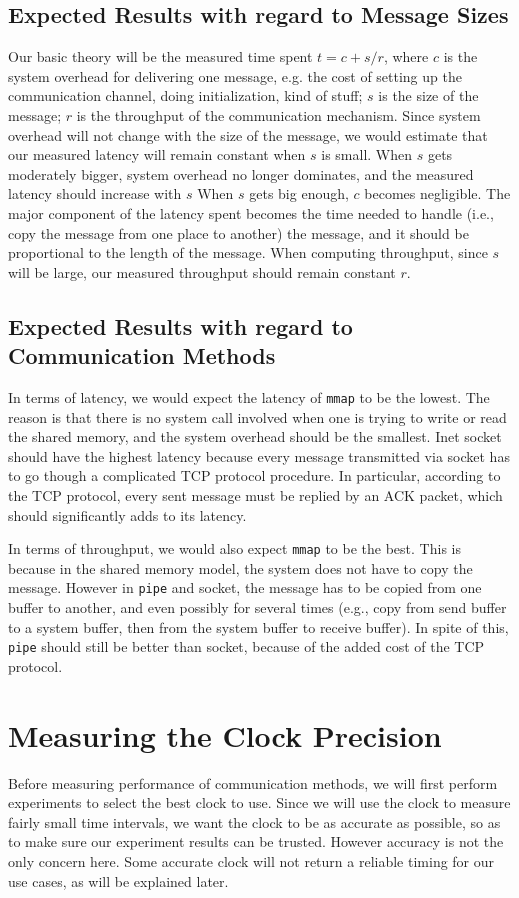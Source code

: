 \documentclass[11pt,conference]{IEEEtran}
\begin{document}
\subsection{Expected Results with regard to Message Sizes}
Our basic theory will be the measured time spent $t=c+s/r$, where $c$ is the system overhead for delivering one message, e.g. the cost of setting up the communication channel, doing initialization, kind of stuff; $s$ is the size of the message; $r$ is the throughput of the communication mechanism.
Since system overhead will not change with the size of the message, we would estimate that our measured latency will remain constant when $s$ is small.
When $s$ gets moderately bigger, system overhead no longer dominates, and the measured latency should increase with $s$
When $s$ gets big enough, $c$ becomes negligible.
The major component of the latency spent becomes the time needed to handle (i.e., copy the message from one place to another) the message, and it should be proportional to the length of the message.
When computing throughput, since $s$ will be large, our measured throughput should remain constant $r$.

\subsection{Expected Results with regard to Communication Methods}
In terms of latency, we would expect the latency of \texttt{mmap} to be the lowest.
The reason is that there is no system call involved when one is trying to write or read the shared memory, and the system overhead should be the smallest.
Inet socket should have the highest latency because every message transmitted via socket has to go though a complicated TCP protocol procedure.
In particular, according to the TCP protocol, every sent message must be replied by an ACK packet, which should significantly adds to its latency.

In terms of throughput, we would also expect \texttt{mmap} to be the best.
This is because in the shared memory model, the system does not have to copy the message.
However in \texttt{pipe} and socket, the message has to be copied from one buffer to another, and even possibly for several times (e.g., copy from send buffer to a system buffer, then from the system buffer to receive buffer).
In spite of this, \texttt{pipe} should still be better than socket, because of the added cost of the TCP protocol.

\section{Measuring the Clock Precision}
\label{sec:clocks}
Before measuring performance of communication methods, we will first perform experiments to select the best clock to use.
Since we will use the clock to measure fairly small time intervals, we want the clock to be as accurate as possible, so as to make sure our experiment results can be trusted.
However accuracy is not the only concern here.
Some accurate clock will not return a reliable timing for our use cases, as will be explained later.
\end{document}
